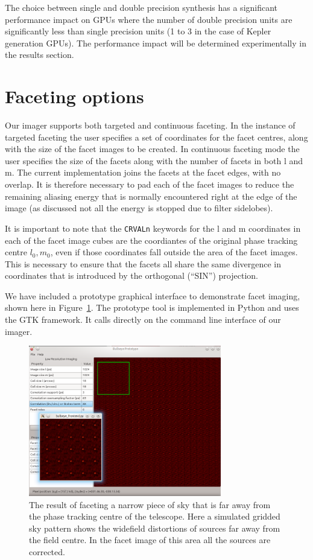 The choice between single and double precision synthesis has a significant performance impact on GPUs where the number of double precision units are significantly
less than single precision units (1 to 3 in the case of Kepler generation GPUs). The performance impact will be determined experimentally in the results section.
\section{Faceting options}
Our imager supports both targeted and continuous faceting. In the instance of targeted faceting the user specifies a set of coordinates 
for the facet centres, along with the size of the facet images to be created. In continuous faceting mode the user specifies the size of the facets along with the number of facets in
both l and m. The current implementation joins the facets at the facet edges, with no overlap. It is therefore necessary to pad each of the facet images to
reduce the remaining aliasing energy that is normally encountered right at the edge of the image (as discussed not all the energy is stopped due to filter sidelobes).

It is important to note that the \texttt{CRVALn} keywords for the l and m coordinates in each of the facet image cubes are the coordiantes of the original phase tracking centre $l_0,m_0$, even
if those coordinates fall outside the area of the facet images. This is necessary to ensure that the facets all share the same divergence in coordinates that is introduced by the
orthogonal (``SIN'') projection.

We have included a prototype graphical interface to demonstrate facet imaging, shown here in Figure~\ref{FIG_TARGETED_FACETING}. The prototype tool is implemented in Python and uses the GTK
framework. It calls directly on the command line interface of our imager.
\begin{figure}[ht!]
 \begin{mdframed}
  \centering
  \includegraphics[width=0.75\textwidth]{images/targeted_faceting.png}
  \caption[Targeted faceting in action]{The result of faceting a narrow piece of sky that is far away from the phase tracking centre of the telescope. Here a simulated gridded sky pattern
  shows the widefield distortions of sources far away from the field centre. In the facet image of this area all the sources are corrected.}
  \label{FIG_TARGETED_FACETING}
 \end{mdframed}
\end{figure}

